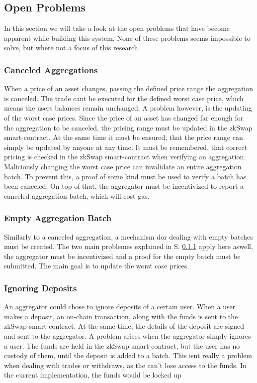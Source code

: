 \documentclass[../../thesis.tex]{subfiles}
\begin{document}
\subsection{Open Problems}
In this section we will take a look at the open problems that have become apparent while building this system. None of these problems seems impossible to solve, but where not a focus of this research. 

\subsubsection{Canceled Aggregations} \label{canceled_aggregation}
When a price of an asset changes, passing the defined price range the aggregation is canceled. The trade cant be executed for the defined worst case price, which means the users balances remain unchanged. A problem however, is the updating of the worst case prices. Since the price of an asset has changed far enough for the aggregation to be canceled, the pricing range must be updated in the zkSwap smart-contract. At the same time it must be ensured, that the price range can simply be updated by anyone at any time. It must be remembered, that correct pricing is checked in the zkSwap smart-contract when verifying an aggregation. Maliciously changing the worst case price can invalidate an entire aggregation batch. To prevent this, a proof of some kind must be used to verify a batch has been canceled. On top of that, the aggregator must be incentivized to report a canceled aggregation batch, which will cost gas.

\subsubsection{Empty Aggregation Batch}
Similarly to a canceled aggregation, a mechanism dor dealing with empty batches must be created. The two main problemes explained in S. \ref{canceled_aggregation} apply here aswell, the aggregator must be incentivized and a proof for the empty batch must be submitted. The main goal is to update the worst case prices. 

\subsubsection{Ignoring Deposits}
An aggregator could chose to ignore deposits of a certain user. When a user makes a deposit, an on-chain transaction, along with the funds is sent to the zkSwap smart-contract. At the same time, the details of the deposit are signed and sent to the aggregator. A problem arises when the aggregator simply ignores a user. The funds are held in the zkSwap smart-contract, but the user has no custody of them, until the deposit is added to a batch. This isnt really a problem when dealing with trades or withdraws, as the can't lose access to the funds. In the current implementation, the funds would be locked up 
\end{document}
